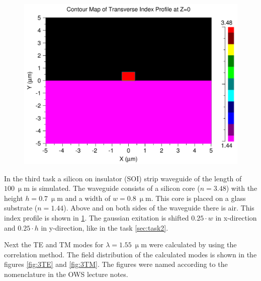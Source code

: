 \begin{figure}%
\centering
 \includegraphics[totalheight=6 cm]{Grafiken/a3_index_profile.pdf}
\caption{}%
\label{fig:index_profile_3}%
\end{figure}


In the third task a silicon on insulator (SOI) strip waveguide of the length of $100~\upmu$m is simulated. The waveguide consists of a silicon core ($n=3.48$) with the height $h=0.7~\upmu$m and a width of $w=0.8~\upmu$m. This core is placed on a glass substrate ($n=1.44$). Above and on both sides of the waveguide there is air. This index profile is shown in \ref{fig:index_profile_3}. The gaussian exitation is shifted $0.25\cdot w$ in x-direction and $0.25\cdot h$ in y-direction, like in the task \ref{sec:task2}.

Next the TE and TM modes for $\lambda = 1.55~\upmu$m were calculated by using the correlation method. The field distribution of the calculated modes is shown in the figures \ref{fig:3TE} and \ref{fig:3TM}. The figures were named according to the nomenclature in the OWS lecture notes.

